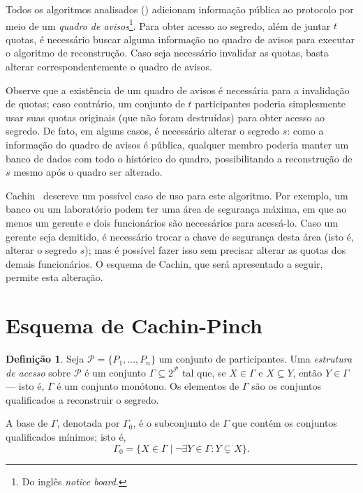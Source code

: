 \documentclass[10pt,twocolumn]{article}
\theoremstyle{definition}
\newtheorem{definition}[theorem]{Definição}
\begin{document}
Todos os algoritmos analisados (\cite{
    VallsVillarMarquez1999,
    BlakleyBlakleyChanMassey1993,
    ChenGollmanMitchellWild1997,
    Sun1999,
    Cachin1995,
    Pinch1996%
})
adicionam informação pública ao protocolo
por meio de um \emph{quadro de avisos}\footnote{
    Do inglês \emph{notice board}.
}.
Para obter acesso ao segredo,
além de juntar $t$ quotas,
é necessário buscar alguma informação no quadro de avisos
para executar o algoritmo de reconstrução.
Caso seja necessário invalidar as quotas,
basta alterar correspondentemente o quadro de avisos.

Observe que a existência de um quadro de avisos
é necessária para a invalidação de quotas;
caso contrário,
um conjunto de $t$ participantes
poderia simplesmente usar suas quotas originais
(que não foram destruídas)
para obter acesso ao segredo.
De fato,
em alguns casos,
é necessário alterar o segredo $s$:
como a informação do quadro de avisos é pública,
qualquer membro poderia manter um banco de dados com todo o histórico do quadro,
possibilitando a reconstrução de $s$
mesmo após o quadro ser alterado.

Cachin~\cite{Cachin1995} descreve um possível caso de uso para este algoritmo.
Por exemplo,
um banco ou um laboratório
podem ter uma área de segurança máxima,
em que ao menos um gerente e dois funcionários são necessários para acessá-lo.
Caso um gerente seja demitido,
é necessário trocar a chave de segurança desta área
(isto é, alterar o segredo $s$);
mas é possível fazer isso sem precisar alterar as quotas dos demais funcionários.
O esquema de Cachin,
que será apresentado a seguir,
permite esta alteração.

\section{Esquema de Cachin-Pinch \cite{Pinch1996}}

\begin{definition}
    Seja $\mathcal P = \{P_1, \dots, P_n\}$ um conjunto de participantes.
    Uma \emph{estrutura de acesso} sobre $\mathcal P$
    é um conjunto $\Gamma \subseteq 2^\mathcal P$
    tal que,
    se $X \in \Gamma$ e $X \subseteq Y$,
    então $Y \in \Gamma$
    --- isto é, $\Gamma$ é um conjunto monótono.
    Os elementos de $\Gamma$ são os conjuntos qualificados a reconstruir o segredo.

    A base de $\Gamma$, denotada por $\Gamma_0$,
    é o subconjunto de $\Gamma$
    que contém os conjuntos qualificados mínimos;
    isto é,
    \begin{equation*}
        \Gamma_0 = \{X \in \Gamma \mid \neg \exists Y \in \Gamma : Y \subsetneq X \}.
    \end{equation*}
\end{definition}
\end{document}

